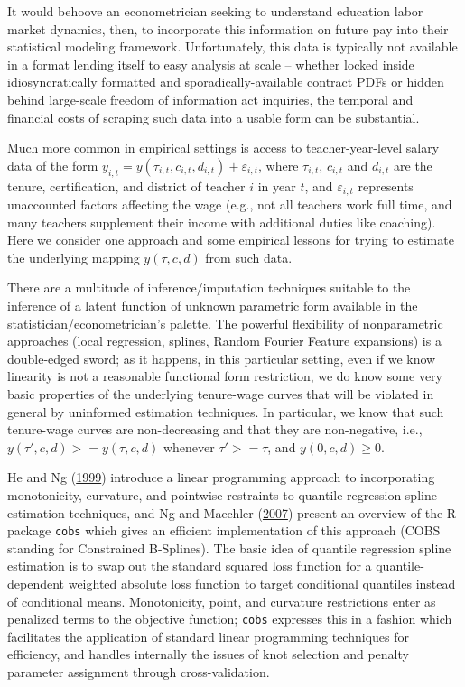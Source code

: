 \documentclass[12pt,]{article}
\begin{document}
It would behoove an econometrician seeking to understand education labor
market dynamics, then, to incorporate this information on future pay
into their statistical modeling framework. Unfortunately, this data is
typically not available in a format lending itself to easy analysis at
scale -- whether locked inside idiosyncratically formatted and
sporadically-available contract PDFs or hidden behind large-scale
freedom of information act inquiries, the temporal and financial costs
of scraping such data into a usable form can be substantial.

Much more common in empirical settings is access to teacher-year-level
salary data of the form
\(y_{i, t} = y(\tau_{i, t}, c_{i, t}, d_{i, t}) + \varepsilon_{i, t}\),
where \(\tau_{i,t}\), \(c_{i, t}\) and \(d_{i, t}\) are the tenure,
certification, and district of teacher \(i\) in year \(t\), and
\(\varepsilon_{i, t}\) represents unaccounted factors affecting the wage
(e.g., not all teachers work full time, and many teachers supplement
their income with additional duties like coaching). Here we consider one
approach and some empirical lessons for trying to estimate the
underlying mapping \(y(\tau, c, d)\) from such data.

There are a multitude of inference/imputation techniques suitable to the
inference of a latent function of unknown parametric form available in
the statistician/econometrician's palette. The powerful flexibility of
nonparametric approaches (local regression, splines, Random Fourier
Feature expansions) is a double-edged sword; as it happens, in this
particular setting, even if we know linearity is not a reasonable
functional form restriction, we do know some very basic properties of
the underlying tenure-wage curves that will be violated in general by
uninformed estimation techniques. In particular, we know that such
tenure-wage curves are non-decreasing and that they are non-negative,
i.e., \(y(\tau', c, d) >= y(\tau, c, d)\) whenever \(\tau' >= \tau\),
and \(y(0, c, d) \geq 0\).

He and Ng (\protect\hyperlink{ref-he}{1999}) introduce a linear
programming approach to incorporating monotonicity, curvature, and
pointwise restraints to quantile regression spline estimation
techniques, and Ng and Maechler (\protect\hyperlink{ref-ng}{2007})
present an overview of the R package \texttt{cobs} which gives an
efficient implementation of this approach (COBS standing for Constrained
B-Splines). The basic idea of quantile regression spline estimation is
to swap out the standard squared loss function for a quantile-dependent
weighted absolute loss function to target conditional quantiles instead
of conditional means. Monotonicity, point, and curvature restrictions
enter as penalized terms to the objective function; \texttt{cobs}
expresses this in a fashion which facilitates the application of
standard linear programming techniques for efficiency, and handles
internally the issues of knot selection and penalty parameter assignment
through cross-validation.
\end{document}
